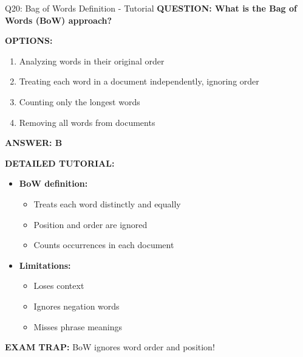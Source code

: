 \documentclass[8pt]{beamer}
\begin{document}
	\begin{frame}{Q20: Bag of Words Definition - Tutorial}
		\fontsize{6.5}{7.5}\selectfont
		\textbf{QUESTION: What is the Bag of Words (BoW) approach?}
		
		\vspace{0.1cm}
		\textbf{OPTIONS:}
		\begin{enumerate}
			\item Analyzing words in their original order
			\item Treating each word in a document independently, ignoring order
			\item Counting only the longest words
			\item Removing all words from documents
		\end{enumerate}
		
		\vspace{0.1cm}
		\textcolor{myblue}{\textbf{ANSWER: B}}
		
		\vspace{0.1cm}
		\textbf{DETAILED TUTORIAL:}
		\begin{itemize}
			\item \textbf{BoW definition:}
			\begin{itemize}
				\item Treats each word distinctly and equally
				\item Position and order are ignored
				\item Counts occurrences in each document
			\end{itemize}
			\item \textbf{Limitations:}
			\begin{itemize}
				\item Loses context
				\item Ignores negation words
				\item Misses phrase meanings
			\end{itemize}
		\end{itemize}
		
		\textcolor{myred}{\textbf{EXAM TRAP:}} BoW ignores \textcolor{myblue}{word order and position}!
	\end{frame}
	
\end{document}

